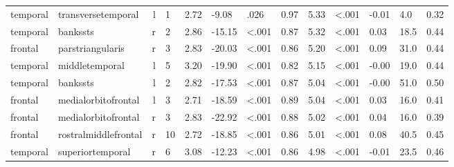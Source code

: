 \documentclass{article}
\begin{document}
\begin{longtable}{llrR{1.5cm}R{1cm}R{1.3cm}R{1cm}R{1cm}R{1.3cm}R{1cm}R{1.8cm}R{1.3cm}R{1.8cm}}
  temporal &        transversetemporal &    l &            1 &                  2.72 &            -9.08 &               .026 &                               0.97 &                          5.33 &                   \textless.001 & -0.01 &    4.0 &      0.32 \\
  temporal &                  bankssts &    r &            2 &                  2.86 &           -15.15 &      \textless.001 &                               0.87 &                          5.32 &                   \textless.001 &  0.03 &   18.5 &      0.44 \\
   frontal &          parstriangularis &    r &            3 &                  2.83 &           -20.03 &      \textless.001 &                               0.86 &                          5.20 &                   \textless.001 &  0.09 &   31.0 &      0.44 \\
  temporal &            middletemporal &    l &            5 &                  3.20 &           -19.90 &      \textless.001 &                               0.82 &                          5.15 &                   \textless.001 & -0.00 &   19.0 &      0.44 \\
  temporal &                  bankssts &    l &            2 &                  2.82 &           -17.53 &      \textless.001 &                               0.87 &                          5.04 &                   \textless.001 & -0.00 &   51.0 &      0.50 \\
   frontal &       medialorbitofrontal &    l &            3 &                  2.71 &           -18.59 &      \textless.001 &                               0.89 &                          5.04 &                   \textless.001 &  0.03 &   16.0 &      0.41 \\
   frontal &       medialorbitofrontal &    r &            3 &                  2.83 &           -22.92 &      \textless.001 &                               0.88 &                          5.02 &                   \textless.001 &  0.04 &   16.0 &      0.39 \\
   frontal &      rostralmiddlefrontal &    r &           10 &                  2.72 &           -18.85 &      \textless.001 &                               0.86 &                          5.01 &                   \textless.001 &  0.08 &   40.5 &      0.45 \\
  temporal &          superiortemporal &    r &            6 &                  3.08 &           -12.23 &      \textless.001 &                               0.86 &                          4.98 &                   \textless.001 & -0.01 &   23.5 &      0.46 \\

\end{longtable}
\end{document}
